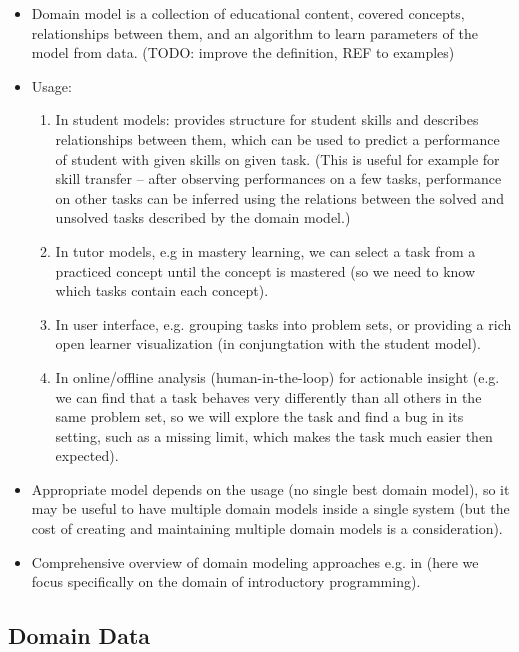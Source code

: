\begin{itemize}
\item Domain model is a collection of educational content, covered concepts,
  relationships between them, and an algorithm to learn
  parameters of the model from data.
  (TODO: improve the definition, REF to examples)
\item Usage:
\begin{enumerate}
\item In student models: provides structure for student skills and describes relationships between them, which can be used to predict a performance of student with given skills on given task.
(This is useful for example for skill transfer -- after observing performances on a few tasks,
    performance on other tasks can be inferred using the relations between the solved and
    unsolved tasks described by the domain model.)
\item In tutor models, e.g in mastery learning, we can select a task from a practiced concept until the concept is mastered (so we need to know which tasks contain each concept).
\item In user interface, e.g. grouping tasks into problem sets,
  or providing a rich open learner visualization (in conjungtation with the student model).
\item In online/offline analysis (human-in-the-loop) for actionable insight
    (e.g. we can find that a task behaves very differently than all others in
    the same problem set, so we will explore the task and find a bug in its setting,
    such as a missing limit, which makes the task much easier then expected).
\end{enumerate}
\item Appropriate model depends on the usage (no single best domain model),
  so it may be useful to have multiple domain models inside a single system
  (but the cost of creating and maintaining multiple domain models is a consideration).
\item Comprehensive overview of domain modeling approaches e.g. in \cite{its-domain-models}
  (here we focus specifically on the domain of introductory programming).
\end{itemize}


\subsection{Domain Data}

